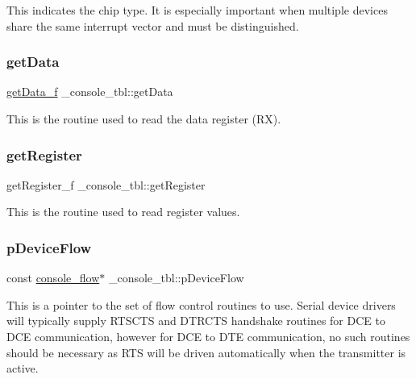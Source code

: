 This indicates the chip type. It is especially important when multiple devices share the same interrupt vector and must be distinguished. \mbox{\label{struct__console__tbl_a87e50fb89c7f3538e362af8414c58d5f}} 
\subsubsection{\texorpdfstring{getData}{getData}}
{\footnotesize\ttfamily \mbox{\hyperlink{serial_8h_a8b3da3714b7a892e4498566118046feb}{get\+Data\+\_\+f}} \+\_\+console\+\_\+tbl\+::get\+Data}

This is the routine used to read the data register (RX). \mbox{\label{struct__console__tbl_ab5d0fa77acd682c7a0be5714fa0d81a9}} 
\subsubsection{\texorpdfstring{getRegister}{getRegister}}
{\footnotesize\ttfamily get\+Register\+\_\+f \+\_\+console\+\_\+tbl\+::get\+Register}

This is the routine used to read register values. \mbox{\label{struct__console__tbl_a303f5a7d96590db6ec8b20834867b30a}} 
\subsubsection{\texorpdfstring{pDeviceFlow}{pDeviceFlow}}
{\footnotesize\ttfamily const \mbox{\hyperlink{struct__console__flow}{console\+\_\+flow}}$\ast$ \+\_\+console\+\_\+tbl\+::p\+Device\+Flow}

This is a pointer to the set of flow control routines to use. Serial device drivers will typically supply R\+T\+S\+C\+TS and D\+T\+R\+C\+TS handshake routines for D\+CE to D\+CE communication, however for D\+CE to D\+TE communication, no such routines should be necessary as R\+TS will be driven automatically when the transmitter is active. \mbox{\label{struct__console__tbl_ad4d1f97eb56c92acd6a466e35908fac2}} 
